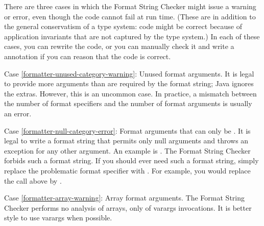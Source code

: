 
There are three cases in which the Format String Checker might issue a
warning or error, even though the code cannot fail at run time.
(These are in addition to the general conservatism of a type system:  code
might be correct because of application invariants that are not captured by
the type system.)
In each of these cases, you can rewrite the code, or you can manually check
it and write a  annotation if you can reason that
the code is correct.


Case \ref{formatter-unused-category-warning}:
  Unused format arguments.  It is legal to provide more arguments than are
  required by the format string; Java ignores the extras.  However, this is
  an uncommon case.  In practice, a mismatch between the number of format
  specifiers and the number of format arguments is usually an error.

Case \ref{formatter-null-category-error}:
  Format arguments that can only be .
  It is legal to write a format string that permits only null arguments and
  throws an exception for any other argument.  An example is
  .
  The Format String Checker forbids such a format string.
  If you should ever need such a format string, simply replace the problematic
  format specifier with .  For example, you would replace the
  call above by .

Case \ref{formatter-array-warning}:
  Array format arguments.
  The Format String Checker performs no analysis of
  arrays, only of varargs invocations.  It is better style to use varargs
  when possible.


